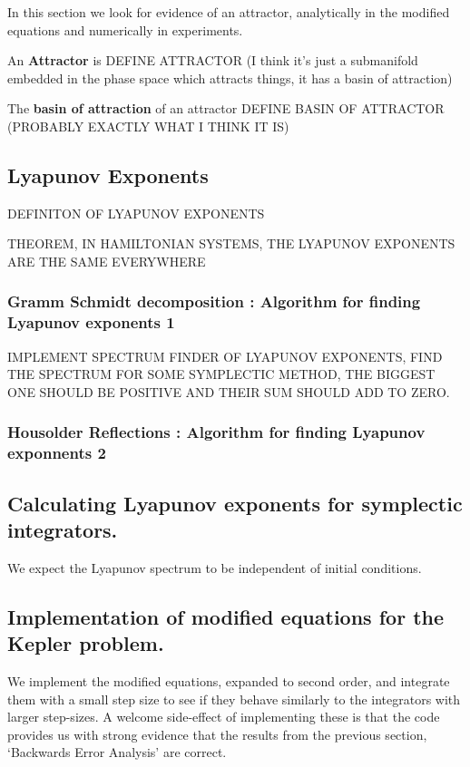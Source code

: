 \documentclass[12pt]{article}
\begin{document}
In this section we look for evidence of an attractor, analytically in the modified equations and numerically in experiments. 

An \textbf{Attractor} is DEFINE ATTRACTOR (I think it's just a submanifold embedded in the phase space which attracts things, it has a basin of attraction)

The \textbf{basin of attraction} of an attractor DEFINE BASIN OF ATTRACTOR (PROBABLY EXACTLY WHAT I THINK IT IS)



\subsection{Lyapunov Exponents}
DEFINITON OF LYAPUNOV EXPONENTS 

THEOREM, IN HAMILTONIAN SYSTEMS, THE LYAPUNOV EXPONENTS ARE THE SAME EVERYWHERE

\subsubsection{Gramm Schmidt decomposition : Algorithm for finding Lyapunov exponents 1}


IMPLEMENT SPECTRUM FINDER OF LYAPUNOV EXPONENTS, FIND THE SPECTRUM FOR SOME SYMPLECTIC METHOD, THE BIGGEST ONE SHOULD BE POSITIVE AND THEIR SUM SHOULD ADD TO ZERO.

\subsubsection{Housolder Reflections : Algorithm for finding Lyapunov exponnents 2}

\subsection{Calculating Lyapunov exponents for symplectic integrators.}
We expect the Lyapunov spectrum to be independent of initial conditions. 

\subsection{Implementation of modified equations for the Kepler problem.}
We implement the modified equations, expanded to second order, and integrate them with a small step size to see if they behave similarly to the integrators with larger step-sizes. A welcome side-effect of implementing these is that the code provides us with strong evidence that the results from the previous section, `Backwards Error Analysis' are correct. 
\end{document}
